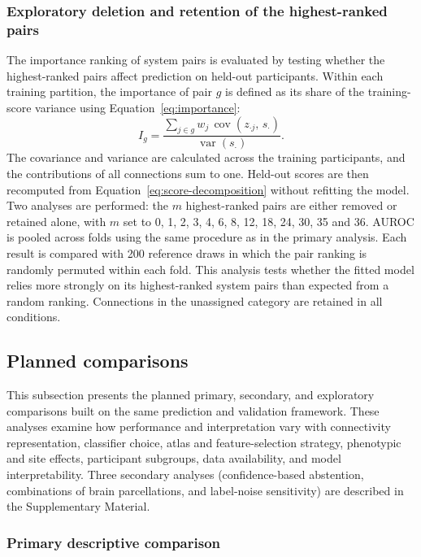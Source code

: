 \subsubsection{Exploratory deletion and retention of the highest-ranked pairs}
\label{subsubsec:deletion-retention}

The importance ranking of system pairs is evaluated by testing whether the highest-ranked pairs affect prediction on held-out participants. Within each training partition, the importance of pair $g$ is defined as its share of the training-score variance using Equation~\eqref{eq:importance}:
\begin{equation}
I_g
=
\frac{\sum_{j\in g} w_j\,\operatorname{cov}\!\left(z_{\cdot j},\, s_{\cdot}\right)}{\operatorname{var}\!\left(s_{\cdot}\right)}.
\label{eq:importance}
\end{equation}
The covariance and variance are calculated across the training participants, and the contributions of all connections sum to one. Held-out scores are then recomputed from Equation~\eqref{eq:score-decomposition} without refitting the model. Two analyses are performed: the $m$ highest-ranked pairs are either removed or retained alone, with $m$ set to 0, 1, 2, 3, 4, 6, 8, 12, 18, 24, 30, 35 and 36. AUROC is pooled across folds using the same procedure as in the primary analysis. Each result is compared with 200 reference draws in which the pair ranking is randomly permuted within each fold. This analysis tests whether the fitted model relies more strongly on its highest-ranked system pairs than expected from a random ranking. Connections in the unassigned category are retained in all conditions.

\subsection{Planned comparisons}
\label{subsec:planned-comparisons}
This subsection presents the planned primary, secondary, and exploratory comparisons built on the same prediction and validation framework. These analyses examine how performance and interpretation vary with connectivity representation, classifier choice, atlas and feature-selection strategy, phenotypic and site effects, participant subgroups, data availability, and model interpretability. Three secondary analyses (confidence-based abstention, combinations of brain parcellations, and label-noise sensitivity) are described in the Supplementary Material. 

\subsubsection{Primary descriptive comparison}
\label{subsubsec:primary-comparisons}

